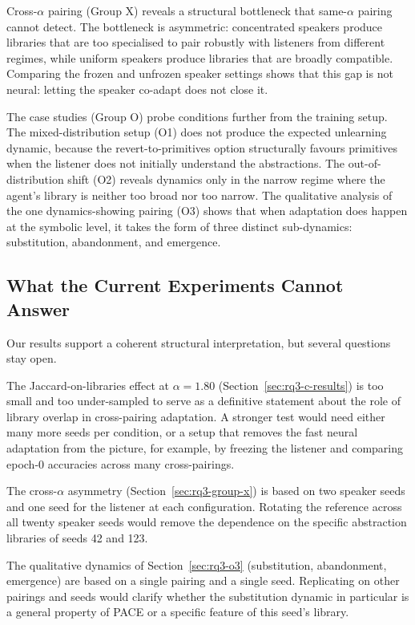 Cross-$\alpha$ pairing (Group X) reveals a structural bottleneck that same-$\alpha$ pairing cannot detect. The bottleneck is asymmetric: concentrated speakers produce libraries that are too specialised to pair robustly with listeners from different regimes, while uniform speakers produce libraries that are broadly compatible. Comparing the frozen and unfrozen speaker settings shows that this gap is not neural: letting the speaker co-adapt does not close it.

The case studies (Group O) probe conditions further from the training setup. The mixed-distribution setup (O1) does not produce the expected unlearning dynamic, because the revert-to-primitives option structurally favours primitives when the listener does not initially understand the abstractions. The out-of-distribution shift (O2) reveals dynamics only in the narrow regime where the agent's library is neither too broad nor too narrow. The qualitative analysis of the one dynamics-showing pairing (O3) shows that when adaptation does happen at the symbolic level, it takes the form of three distinct sub-dynamics: substitution, abandonment, and emergence.

\subsection{What the Current Experiments Cannot Answer}
\label{sec:rq3-open-questions}

Our results support a coherent structural interpretation, but several questions stay open.

The Jaccard-on-libraries effect at $\alpha = 1.80$ (Section~\ref{sec:rq3-c-results}) is too small and too under-sampled to serve as a definitive statement about the role of library overlap in cross-pairing adaptation. A stronger test would need either many more seeds per condition, or a setup that removes the fast neural adaptation from the picture, for example, by freezing the listener and comparing epoch-0 accuracies across many cross-pairings.

The cross-$\alpha$ asymmetry (Section~\ref{sec:rq3-group-x}) is based on two speaker seeds and one seed for the listener at each configuration. Rotating the reference across all twenty speaker seeds would remove the dependence on the specific abstraction libraries of seeds 42 and 123.

The qualitative dynamics of Section~\ref{sec:rq3-o3} (substitution, abandonment, emergence) are based on a single pairing and a single seed. Replicating on other pairings and seeds would clarify whether the substitution dynamic in particular is a general property of PACE or a specific feature of this seed's library.